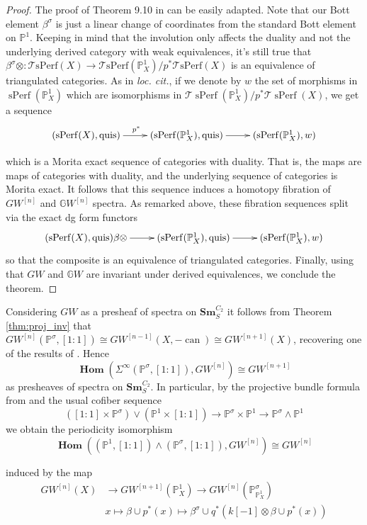\documentclass[draftthesis,tocnosub,noragright,centerchapter,10pt]{uiucthesis2009}
\newcommand{\mbb}{\mathbb}
\newcommand{\mc}{\mathcal}
\newcommand{\Sm}[1]{\mathbf{Sm}_{#1}}
\DeclareMathOperator{\can}{can}
\DeclareMathOperator{\iHom}{\mathbf{Hom}}
\DeclareMathOperator{\sPerf}{sPerf}
\theoremstyle{plain}
\theoremstyle{definition}
\begin{document}
\begin{proof}
The proof of Theorem 9.10 in \cite{Schder} can be easily adapted. Note
that our Bott element $\beta^\sigma$ is just a linear change of
coordinates from the standard Bott element on $\mbb P^1$. Keeping in
mind that the involution only affects the duality and not the
underlying derived category with weak equivalences, it's still true
that $\beta^\sigma \otimes : \mc T\mathrm{sPerf}(X) \rightarrow \mc
T\mathrm{sPerf}(\mbb P^1_X)/p^*\mc T\mathrm{sPerf}(X)$ is an
equivalence of triangulated categories. As in
\textit{loc. cit.}, if we denote by $w$ the set of morphisms in
$\sPerf(\mbb P^1_X)$ which are isomorphisms in $\mc T\sPerf(\mbb
P^1_X)/p^*\mc T\sPerf(X)$, we get a sequence
\[
\xymatrix{(\sPerf(X),\mathrm{quis}) \ar[r]^{p^*} & (\sPerf(\mbb
  P^1_X),\mathrm{quis}) \ar[r] & (\sPerf(\mbb P^1_X),w)}
\]

which is a Morita exact sequence of categories with duality. That is,
the maps are maps of categories with duality, and the underlying
sequence of categories is Morita exact. It follows that this sequence
induces a homotopy fibration of $GW^{[n]}$ and $\mbb GW^{[n]}$
spectra. As remarked above, these fibration sequences split via the
exact dg form functors
\[
\xymatrix{(\sPerf(X),\mathrm{quis}) \ar[r]{\beta \otimes} & (\sPerf(\mbb
  P^1_X),\mathrm{quis}) \ar[r] & (\sPerf(\mbb P^1_X),w)}
\]
so that the composite is an equivalence of triangulated categories.
Finally, using that $GW$ and $\mbb GW$ are invariant under derived
equivalences, we conclude the theorem.
\end{proof}

Considering $GW$ as a presheaf of spectra on $\Sm{S}^{C_2}$ it follows from
Theorem \ref{thm:proj_inv} that $GW^{[n]}(\mbb P^\sigma,[1:1]) \cong
GW^{[n-1]}(X,-\can) \cong GW^{[n+1]}(X)$, recovering one of the results of
  \cite{Xie2018ATM}. Hence
\[
\iHom(\Sigma^\infty (\mbb P^\sigma,[1:1]),GW^{[n]}) \cong
GW^{[n+1]}
\]
as presheaves of spectra on $\Sm{S}^{C_2}$. In particular, by the
projective bundle formula from \cite{Schder} and the usual cofiber
sequence 
\[
([1:1] \times \mbb P^\sigma) \vee (\mbb P^1 \times [1:1]) \rightarrow
\mbb P^\sigma \times \mbb P^1 \rightarrow \mbb P^\sigma \wedge \mbb P^1
\]
we obtain the periodicity isomorphism  
\[
\iHom((\mbb P^1,[1:1]) \wedge (\mbb P^\sigma,[1:1]),GW^{[n]}) \cong
GW^{[n]}
\]

induced by the map 
\begin{align*}
GW^{[n]}(X) &\rightarrow GW^{[n+1]}(\mbb P^1_X) \rightarrow
              GW^{[n]}(\mbb P^\sigma_{\mbb P^1_X})\\
& x \mapsto \beta \cup p^*(x) \mapsto \beta^\sigma \cup q^*(k[-1]
  \otimes \beta \cup p^*(x))
\end{align*}
\end{document}
